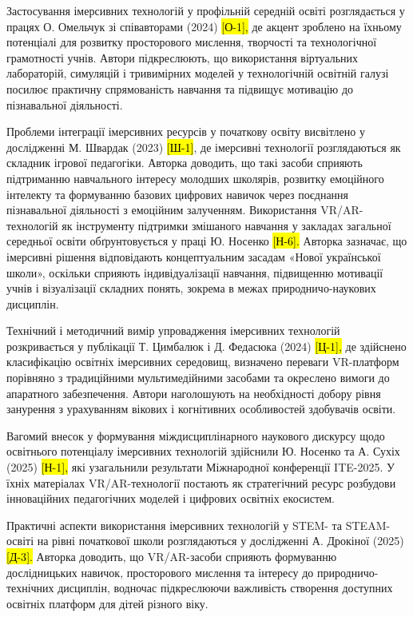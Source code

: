 Застосування імерсивних технологій у профільній середній освіті розглядається у працях О. Омельчук зі співавторами (2024) \hl{{[}О-1{]},} де акцент зроблено на їхньому потенціалі для розвитку просторового мислення, творчості та технологічної грамотності учнів. Автори підкреслюють, що використання віртуальних лабораторій, симуляцій і тривимірних моделей у технологічній освітній галузі посилює практичну спрямованість навчання та підвищує мотивацію до пізнавальної діяльності.

Проблеми інтеграції імерсивних ресурсів у початкову освіту висвітлено у дослідженні М. Швардак (2023) \hl{{[}Ш-1{]}}, де імерсивні технології розглядаються як складник ігрової педагогіки. Авторка доводить, що такі засоби сприяють підтриманню навчального інтересу молодших школярів, розвитку емоційного інтелекту та формуванню базових цифрових навичок через поєднання пізнавальної діяльності з емоційним залученням. Використання VR/AR-технологій як інструменту підтримки змішаного навчання у закладах загальної середньої освіти обґрунтовується у праці Ю. Носенко \hl{{[}Н-6{]}.} Авторка зазначає, що імерсивні рішення відповідають концептуальним засадам «Нової української школи», оскільки сприяють індивідуалізації навчання, підвищенню мотивації учнів і візуалізації складних понять, зокрема в межах природничо-наукових дисциплін.

Технічний і методичний вимір упровадження імерсивних технологій розкривається у публікації Т. Цимбалюк і Д. Федасюка (2024) \hl{{[}Ц-1{]},} де здійснено класифікацію освітніх імерсивних середовищ, визначено переваги VR-платформ порівняно з традиційними мультимедійними засобами та окреслено вимоги до апаратного забезпечення. Автори наголошують на необхідності добору рівня занурення з урахуванням вікових і когнітивних особливостей здобувачів освіти.

Вагомий внесок у формування міждисциплінарного наукового дискурсу щодо освітнього потенціалу імерсивних технологій здійснили Ю. Носенко та А. Сухіх (2025) \hl{{[}Н-1{]},} які узагальнили результати Міжнародної конференції ITE-2025. У їхніх матеріалах VR/AR-технології постають як стратегічний ресурс розбудови інноваційних педагогічних моделей і цифрових освітніх екосистем.

Практичні аспекти використання імерсивних технологій у STEM- та STEAM-освіті на рівні початкової школи розглядаються у дослідженні А. Дрокіної (2025) \hl{{[}Д-3{]}.} Авторка доводить, що VR/AR-засоби сприяють формуванню дослідницьких навичок, просторового мислення та інтересу до природничо-технічних дисциплін, водночас підкреслюючи важливість створення доступних освітніх платформ для дітей різного віку.

